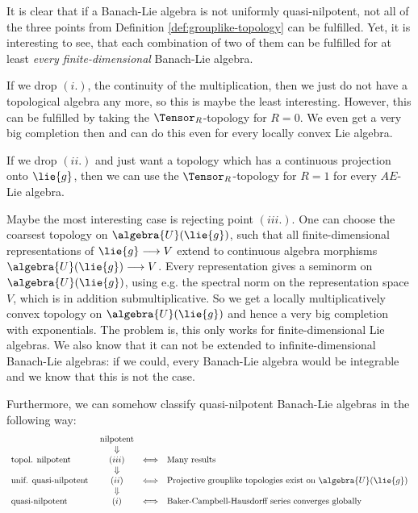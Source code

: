 \documentclass[
11pt,                          %
english                        %
]{article}
\begin{document}
\begin{remark}
	It is clear that if a Banach-Lie algebra is not uniformly quasi-nilpotent,
	not all of the three points from Definition \ref{def:grouplike-topology} can be
	fulfilled. Yet, it is interesting to see, that each combination of two of them
	can be fulfilled for at least \emph{every finite-dimensional} Banach-Lie 
	algebra.
	\begin{remarklist}
		\item
		If we drop $(i.)$, the continuity of the multiplication, then we just do not
		have a topological algebra any more, so this is maybe the least interesting.
		However, this can be fulfilled by taking the $\Tensor_R$-topology for 
		$R = 0$. We even get a very big completion then and can do this even for
		every locally convex Lie algebra.
		
		\item
		If we drop $(ii.)$ and just want a topology which has a continuous 
		projection onto $\lie{g}$, then we can use the $\Tensor_R$-topology for 
		$R = 1$ for every $AE$-Lie algebra.

		\item
		Maybe the most interesting case is rejecting point $(iii.)$. One can choose 
		the coarsest topology on $\algebra{U}(\lie{g})$, such that all 
		finite-dimensional representations of $\lie{g} \longrightarrow V$ extend to 
		continuous algebra morphisms $\algebra{U}(\lie{g}) \longrightarrow V$.
		Every representation gives a seminorm on $\algebra{U}(\lie{g})$, using e.g.
		the spectral norm on the representation space $V$, which is in addition
		submultiplicative. So we get a locally multiplicatively convex topology
		on $\algebra{U}(\lie{g})$ and hence a very big completion with exponentials.
		The problem is, this only works for finite-dimensional Lie algebras. We also 
		know that it can not be extended to infinite-dimensional Banach-Lie 
		algebras: if we could, every Banach-Lie algebra would be integrable and we 
		know that this is not the case.
	\end{remarklist}
\end{remark}


Furthermore, we can somehow classify quasi-nilpotent Banach-Lie algebras in the 
following way:
\begin{equation}
	\label{classification}
	\begin{array}{lccl}
		& \text{nilpotent} &
		\\
		& \Downarrow &
		\\
		\text{topol. nilpotent } &
		(iii) & \Longleftrightarrow &
		\text{Many results}
		\\
		& \Downarrow &
		\\
		\text{unif. quasi-nilpotent } &
		(ii) & \Longleftrightarrow &
		\text{Projective grouplike topologies exist on }
		\algebra{U}(\lie{g})
		\\
		& \Downarrow &
		\\
		\text{quasi-nilpotent } &
		(i) & \Longleftrightarrow &
		\text{Baker-Campbell-Hausdorff series converges globally}
	\end{array}
\end{equation}
\end{document}
